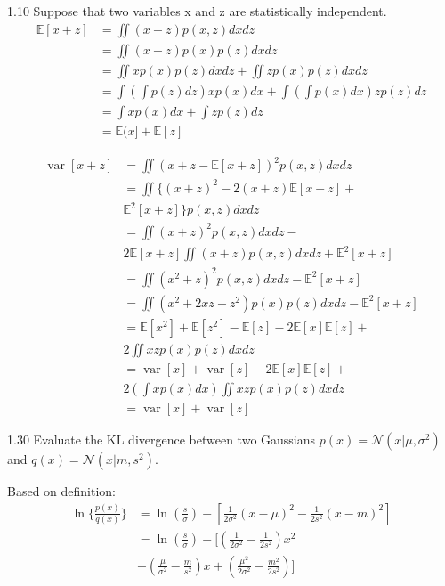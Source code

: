 \documentclass[5p,sort&compress]{elsarticle}
\begin{document}
1.10 Suppose that two variables x and z are statistically independent.
\begin{equation}
\begin{aligned} \mathbb{E}[x+z] &=\iint(x+z) p(x, z) d x d z \\ &=\iint(x+z) p(x) p(z) d x d z \\ &=\iint x p(x) p(z) d x d z+\iint z p(x) p(z) d x d z \\ &=\int\left(\int p(z) d z\right) x p(x) d x+\int\left(\int p(x) d x\right) z p(z) d z \\ &=\int x p(x) d x+\int z p(z) d z \\ &=\mathbb{E}(x]+\mathbb{E}[z] \end{aligned}
\end{equation}

\begin{equation}
\begin{aligned} \operatorname{var}[x+z] &=\iint(x+z-\mathbb{E}[x+z])^{2} p(x, z) d x d z \\ & =\iint\{(x+z)^{2}-2(x+z) \mathbb{E}[x+z]+ \\ & \mathbb{E}^{2}[x+z]\} p(x, z) d x d z \\ &=\iint(x+z)^{2} p(x, z) d x d z- \\ & 2 \mathbb{E}[x+z] \iint(x+z) p(x, z) d x d z+\mathbb{E}^{2}[x+z] \\ &=\iint\left(x^{2}+z\right)^{2} p(x, z) d x d z-\mathbb{E}^{2}[x+z] \\ &=\iint\left(x^{2}+2 x z+z^{2}\right) p(x) p(z) d x d z-\mathbb{E}^{2}[x+z] \\ &=\mathbb{E}\left[x^{2}\right]+\mathbb{E}\left[z^{2}\right]-\mathbb{E}[z]-2 \mathbb{E}[x] \mathbb{E}[z]+ \\ & 2 \iint x z p(x) p(z) d x d z \\ &=\operatorname{var}[x]+\operatorname{var}[z]-2 \mathbb{E}[x] \mathbb{E}[z]+ \\ & 2\left(\int x p(x) d x\right) \iint x z p(x) p(z) d x d z \\ &=\operatorname{var}[x]+\operatorname{var}[z] \end{aligned}
\end{equation}

1.30 Evaluate the KL divergence between two Gaussians $p(x)=\mathcal{N}\left(x | \mu, \sigma^{2}\right)$ and $q(x)=\mathcal{N}\left(x | m, s^{2}\right)$.

Based on definition:
\begin{equation}
\begin{aligned} \ln \{\frac{p(x)}{q(x)}\} &=\ln \left(\frac{s}{\sigma}\right)-[\frac{1}{2 \sigma^{2}}(x-\mu)^{2}-\frac{1}{2 s^{2}}(x-m)^{2}] \\ &=\ln \left(\frac{s}{\sigma}\right)-[\left(\frac{1}{2 \sigma^{2}}-\frac{1}{2 s^{2}}\right) x^{2} \\ & -\left(\frac{\mu}{\sigma^{2}}-\frac{m}{s^{2}}\right) x+\left(\frac{\mu^{2}}{2 \sigma^{2}}-\frac{m^{2}}{2 s^{2}}\right)] \end{aligned}
\end{equation}
\end{document}
